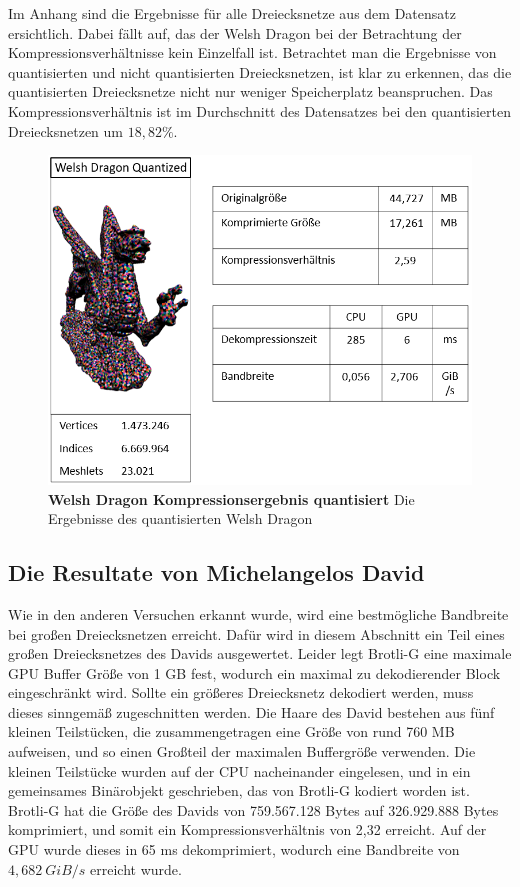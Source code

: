 Im Anhang sind die Ergebnisse für alle Dreiecksnetze aus dem Datensatz ersichtlich.
Dabei fällt auf, das der Welsh Dragon bei der Betrachtung der Kompressionsverhältnisse kein Einzelfall ist.
Betrachtet man die Ergebnisse von quantisierten und nicht quantisierten Dreiecksnetzen, ist klar zu erkennen, das die quantisierten Dreiecksnetze nicht nur weniger Speicherplatz beanspruchen.
Das Kompressionsverhältnis ist im Durchschnitt des Datensatzes bei den quantisierten Dreiecksnetzen um $\mathit{18,82\%}$.

\begin{figure}[htb]
  \centering  
  \includegraphics[scale=0.75]{Bilder/ergebnisse/welshdragon_q.png}
  \caption[Welsh Dragon Kompressionsergebnis quantisiert]{\textbf{Welsh Dragon Kompressionsergebnis quantisiert} Die Ergebnisse des quantisierten Welsh Dragon }
  \label{fig:quantized_welsh_dragon}
\end{figure}

\subsection{Die Resultate von Michelangelos David}
\label{subsec:auswertung3}
Wie in den anderen Versuchen erkannt wurde, wird eine bestmögliche Bandbreite bei großen Dreiecksnetzen erreicht.
Dafür wird in diesem Abschnitt ein Teil eines großen Dreiecksnetzes des Davids ausgewertet.
Leider legt Brotli-G eine maximale GPU Buffer Größe von 1 GB fest, wodurch ein maximal zu dekodierender Block eingeschränkt wird.
Sollte ein größeres Dreiecksnetz dekodiert werden, muss dieses sinngemäß zugeschnitten werden.
Die Haare des David bestehen aus fünf kleinen Teilstücken, die zusammengetragen eine Größe von rund 760 MB aufweisen, und so einen Großteil der maximalen Buffergröße verwenden.
Die kleinen Teilstücke wurden auf der CPU nacheinander eingelesen, und in ein gemeinsames Binärobjekt geschrieben, das von Brotli-G kodiert worden ist. \newline
Brotli-G hat die Größe des Davids von 759.567.128 Bytes auf 326.929.888 Bytes komprimiert, und somit ein Kompressionsverhältnis von 2,32 erreicht.
Auf der GPU wurde dieses in 65 ms dekomprimiert, wodurch eine Bandbreite von $\mathit{4,682 \ GiB/s}$ erreicht wurde.

